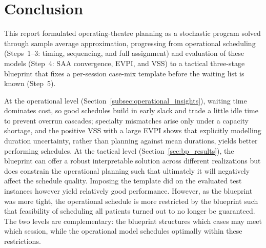 \section{Conclusion}
\label{sec:conclusion}

This report formulated operating-theatre planning as a stochastic program solved
through sample average approximation, progressing from operational scheduling
(Steps~1--3: timing, sequencing, and full assignment) and evaluation
of these models (Step~4: SAA convergence, EVPI, and VSS) to a tactical three-stage
blueprint that fixes a per-session case-mix template before the waiting list is
known (Step~5).

At the operational level
(Section~\ref{subsec:operational_insights}), waiting time dominates cost, so good
schedules build in early slack and trade a little idle time to prevent overrun
cascades; specialty mismatches arise only under a capacity shortage, and the positive VSS with a large EVPI shows that
explicitly modelling duration uncertainty, rather than planning against mean
durations, yields better performing schedules. At the
tactical level (Section~\ref{sec:bp_results}), the blueprint can offer a robust interpretable solution
across different realizations but does constrain the operational planning such that ultimately it will negatively affect the schedule quality. 
Imposing the template did on the evaluated test instances however yield relatively good performance.
However, as the blueprint was more tight, the operational schedule is more restricted by the blueprint such that feasibility of scheduling all patients turned out to no longer be guaranteed.
The two levels are complementary: the blueprint structures which cases may
meet which session, while the operational model schedules optimally within these restrictions.


